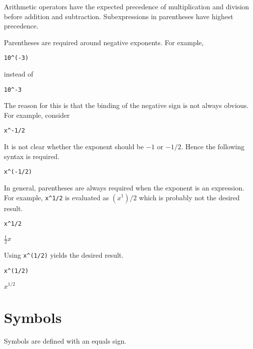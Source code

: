 \documentclass[12pt]{article}
\begin{document}
\newpage

Arithmetic operators have the expected precedence of
multiplication and division before addition and subtraction.
Subexpressions in parentheses have highest precedence.

\bigskip
Parentheses are required around negative exponents.
For example,

{\color{blue}
\begin{verbatim}
10^(-3)
\end{verbatim}
}

instead of

{\color{blue}
\begin{verbatim}
10^-3
\end{verbatim}
}

The reason for this is that the binding of the negative sign is not always obvious.
For example, consider

{\color{blue}
\begin{verbatim}
x^-1/2
\end{verbatim}
}

It is not clear whether the exponent should be $-1$ or $-1/2$.
Hence the following syntax is required.

{\color{blue}
\begin{verbatim}
x^(-1/2)
\end{verbatim}
}

In general, parentheses are always required when the exponent
is an expression.
For example, \verb$x^1/2$ is evaluated as $(x^1)/2$ which
is probably not the desired result.

{\color{blue}
\begin{verbatim}
x^1/2
\end{verbatim}
}

$\displaystyle \tfrac{1}{2}x$

\bigskip

Using \verb$x^(1/2)$ yields the desired result.

{\color{blue}
\begin{verbatim}
x^(1/2)
\end{verbatim}
}

$\displaystyle x^{1/2}$

\newpage

\section{Symbols}

Symbols are defined with an equals sign.
\end{document}
